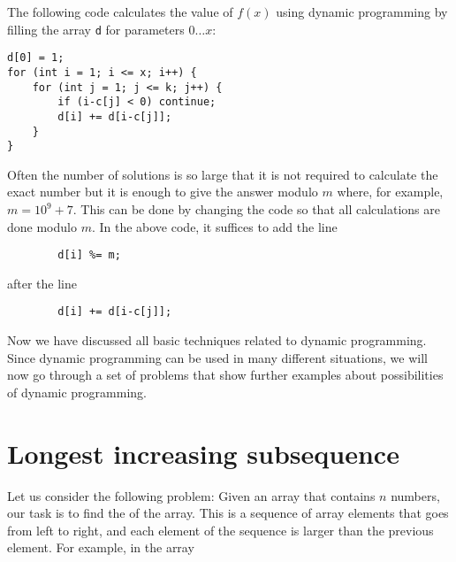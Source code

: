 The following code calculates the value of $f(x)$
using dynamic programming by filling the array
\texttt{d} for parameters $0 \ldots x$:

\begin{lstlisting}
d[0] = 1;
for (int i = 1; i <= x; i++) {
    for (int j = 1; j <= k; j++) {
        if (i-c[j] < 0) continue;
        d[i] += d[i-c[j]];
    }
}
\end{lstlisting}

Often the number of solutions is so large
that it is not required to calculate the exact number
but it is enough to give the answer modulo $m$
where, for example, $m=10^9+7$.
This can be done by changing the code so that
all calculations are done modulo $m$.
In the above code, it suffices to add the line
\begin{lstlisting}
        d[i] %= m;
\end{lstlisting}
after the line
\begin{lstlisting}
        d[i] += d[i-c[j]];
\end{lstlisting}

Now we have discussed all basic
techniques related to
dynamic programming.
Since dynamic programming can be used
in many different situations,
we will now go through a set of problems
that show further examples about
possibilities of dynamic programming.

\section{Longest increasing subsequence}


Let us consider the following problem:
Given an array that contains $n$
numbers,
our task is to find the
of the array.
This is a sequence of array elements
that goes from left to right,
and each element of the sequence is larger
than the previous element.
For example, in the array

